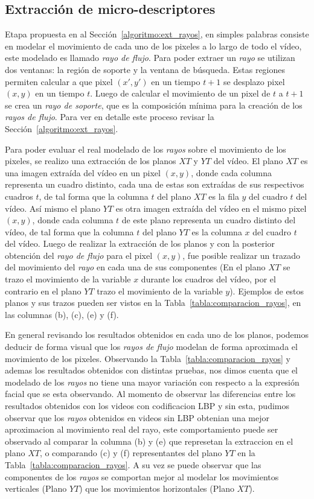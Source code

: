 \subsection{Extracción de micro-descriptores}
\label{exp:micro-descriptores}

Etapa propuesta en al Sección~\ref{algoritmo:ext_rayos}, en simples palabras consiste en modelar el movimiento de cada uno de los pixeles a lo largo de todo el vídeo, este modelado es llamado \textit{rayo de flujo}. Para poder extraer un \textit{rayo} se utilizan dos ventanas: la región de soporte y la ventana de búsqueda. Estas regiones permiten calcular a que pixel $(x',y')$ en un tiempo $t+1$ se desplazo pixel $(x,y)$ en un tiempo $t$. Luego de calcular el movimiento de un pixel de $t$ a $t+1$ se crea un \textit{rayo de soporte}, que es la composición mínima para la creación de los \textit{rayos de flujo}. Para ver en detalle este proceso revisar la Sección~\ref{algoritmo:ext_rayos}.

Para poder evaluar el real modelado de los \textit{rayos} sobre el movimiento de los pixeles, se realizo una extracción de los planos $XT$ y $YT$ del vídeo. El plano $XT$ es una imagen extraída del vídeo en un pixel $(x,y)$, donde cada columna representa un cuadro distinto, cada una de estas son extraídas de sus respectivos cuadros $t$, de tal forma que la columna $t$ del plano $XT$ es la fila $y$ del cuadro $t$ del vídeo. Así mismo el plano $YT$ es otra imagen extraída del vídeo en el mismo pixel $(x,y)$, donde cada columna $t$ de este plano representa un cuadro distinto del vídeo, de tal forma que la columna $t$ del plano $YT$ es la columna $x$ del cuadro $t$ del vídeo. Luego de realizar la extracción de los planos y con la posterior obtención del \textit{rayo de flujo} para el pixel $(x,y)$, fue posible realizar un trazado del movimiento del \textit{rayo} en cada una de sus componentes (En el plano $XT$ se trazo el movimiento de la variable $x$ durante los cuadros del vídeo, por el contrario en el plano $YT$ trazo el movimiento de la variable $y$). Ejemplos de estos planos y sus trazos pueden ser vistos en la Tabla~\ref{tabla:comparacion_rayos}, en las columnas (b), (c), (e) y (f).

En general revisando los resultados obtenidos en cada uno de los planos, podemos deducir de forma visual que los \textit{rayos de flujo} modelan de forma aproximada el movimiento de los pixeles. Observando la Tabla~\ref{tabla:comparacion_rayos} y ademas los resultados obtenidos con distintas pruebas, nos dimos cuenta que el modelado de los \textit{rayos} no tiene una mayor variación con respecto a la expresión facial que se esta observando. Al momento de observar las diferencias entre los resultados obtenidos con los videos con codificacion LBP y sin esta, pudimos observar que los \textit{rayos} obtenidos en videos sin LBP obtenian una mejor aproximacion al movimiento real del rayo, este comportamiento puede ser observado al comparar la columna (b) y (e) que represetan la extraccion en el plano $XT$, o comparando (c) y (f) representantes del plano $YT$ en la Tabla~\ref{tabla:comparacion_rayos}. A su vez se puede observar que las componentes de los \textit{rayos} se comportan mejor al modelar los movimientos verticales (Plano $YT$) que los movimientos horizontales (Plano $XT$).


